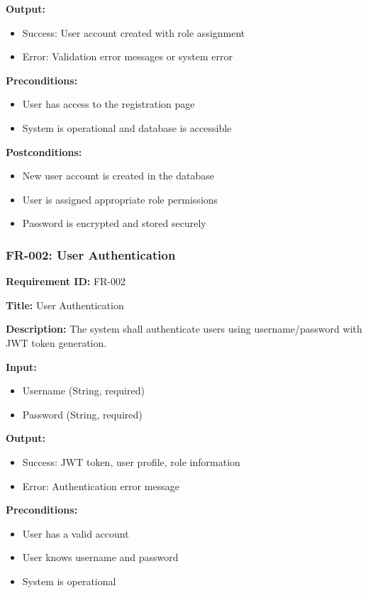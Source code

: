 \documentclass[12pt,a4paper]{article}
\begin{document}
\textbf{Output:}
\begin{itemize}
    \item Success: User account created with role assignment
    \item Error: Validation error messages or system error
\end{itemize}

\textbf{Preconditions:}
\begin{itemize}
    \item User has access to the registration page
    \item System is operational and database is accessible
\end{itemize}

\textbf{Postconditions:}
\begin{itemize}
    \item New user account is created in the database
    \item User is assigned appropriate role permissions
    \item Password is encrypted and stored securely
\end{itemize}

\subsubsection{FR-002: User Authentication}

\textbf{Requirement ID:} FR-002

\textbf{Title:} User Authentication

\textbf{Description:} The system shall authenticate users using username/password with JWT token generation.

\textbf{Input:}
\begin{itemize}
    \item Username (String, required)
    \item Password (String, required)
\end{itemize}

\textbf{Output:}
\begin{itemize}
    \item Success: JWT token, user profile, role information
    \item Error: Authentication error message
\end{itemize}

\textbf{Preconditions:}
\begin{itemize}
    \item User has a valid account
    \item User knows username and password
    \item System is operational
\end{itemize}
\end{document}
